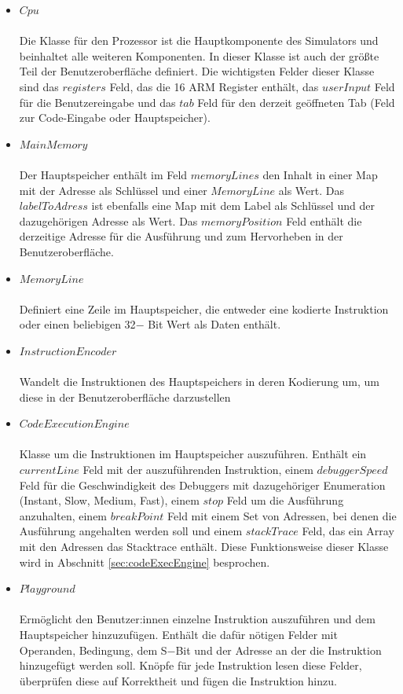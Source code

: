 \documentclass[a4paper, 11pt, onecolumn]{article}
\begin{document}
\begin{itemize}
\item $Cpu$\\ \\Die Klasse für den Prozessor ist die Hauptkomponente des Simulators und beinhaltet alle weiteren Komponenten. In dieser Klasse ist auch der größte Teil der Benutzeroberfläche definiert. Die wichtigsten Felder dieser Klasse sind das $registers$ Feld, das die 16 ARM Register enthält, das $userInput$ Feld für die Benutzereingabe und das $tab$ Feld für den derzeit geöffneten Tab (Feld zur Code-Eingabe oder Hauptspeicher).
\item $MainMemory$\\ \\Der Hauptspeicher enthält im Feld $memoryLines$ den Inhalt in einer Map mit der Adresse als Schlüssel und einer $MemoryLine$ als Wert. Das $labelToAdress$ ist ebenfalls eine Map mit dem Label als Schlüssel und der dazugehörigen Adresse als Wert. Das $memoryPosition$ Feld enthält die derzeitige Adresse für die Ausführung und zum Hervorheben in der Benutzeroberfläche.
\item $MemoryLine$\\ \\Definiert eine Zeile im Hauptspeicher, die entweder eine kodierte Instruktion oder einen beliebigen 32$-$ Bit Wert als Daten enthält.
\item $InstructionEncoder$\\ \\Wandelt die Instruktionen des Hauptspeichers in deren Kodierung um, um diese in der Benutzeroberfläche darzustellen
\item $CodeExecutionEngine$\\ \\Klasse um die Instruktionen im Hauptspeicher auszuführen. Enthält ein $currentLine$ Feld mit der auszuführenden Instruktion, einem $debuggerSpeed$ Feld für die Geschwindigkeit des Debuggers mit dazugehöriger Enumeration (Instant, Slow, Medium, Fast), einem $stop$ Feld um die Ausführung anzuhalten, einem $breakPoint$ Feld mit einem Set von Adressen, bei denen die Ausführung angehalten werden soll und einem $stackTrace$ Feld, das ein Array mit den Adressen das Stacktrace enthält. Diese Funktionsweise dieser Klasse wird in Abschnitt \ref{sec:codeExecEngine} besprochen.
\item $Playground$\\ \\Ermöglicht den Benutzer:innen einzelne Instruktion auszuführen und dem Hauptspeicher hinzuzufügen. Enthält die dafür nötigen Felder mit Operanden, Bedingung, dem S$-$Bit und der Adresse an der die Instruktion hinzugefügt werden soll. Knöpfe für jede Instruktion lesen diese Felder, überprüfen diese auf Korrektheit und fügen die Instruktion hinzu.

\end{itemize}
\end{document}
